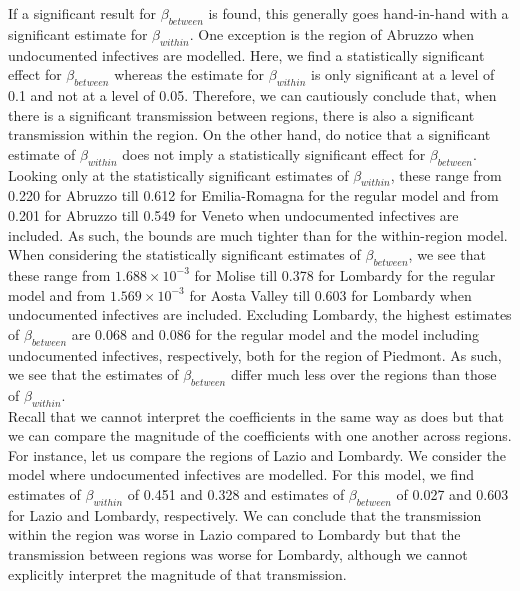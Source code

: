 \documentclass[12pt]{article}
\begin{document}
	If a significant result for $\beta_{between}$ is found, this generally goes hand-in-hand with a significant estimate for $\beta_{within}$. One exception is the region of Abruzzo when undocumented infectives are modelled. Here, we find a statistically significant effect for $\beta_{between}$ whereas the estimate for $\beta_{within}$ is only significant at a level of 0.1 and not at a level of 0.05. Therefore, we can cautiously conclude that, when there is a significant transmission between regions, there is also a significant transmission within the region. On the other hand, do notice that a significant estimate of $\beta_{within}$ does not imply a statistically significant effect for $\beta_{between}$. \\
	
	Looking only at the statistically significant estimates of $\beta_{within}$, these range from 0.220 for Abruzzo till 0.612 for Emilia-Romagna for the regular model and from 0.201 for Abruzzo till 0.549 for Veneto when undocumented infectives are included. As such, the bounds are much tighter than for the within-region model. When considering the statistically significant estimates of $\beta_{between}$, we see that these range from $1.688 \times 10^{-3}$ for Molise till 0.378 for Lombardy for the regular model and from $1.569 \times 10^{-3}$ for Aosta Valley till 0.603 for Lombardy when undocumented infectives are included. Excluding Lombardy, the highest estimates of $\beta_{between}$ are 0.068 and 0.086 for the regular model and the model including undocumented infectives, respectively, both for the region of Piedmont. As such, we see that the estimates of $\beta_{between}$ differ much less over the regions than those of $\beta_{within}$. \\
	
	Recall that we cannot interpret the coefficients in the same way as \textcite{adda2016economic} does but that we can compare the magnitude of the coefficients with one another across regions. For instance, let us compare the regions of Lazio and Lombardy. We consider the model where undocumented infectives are modelled. For this model, we find estimates of $\beta_{within}$ of 0.451 and 0.328 and estimates of $\beta_{between}$ of 0.027 and 0.603 for Lazio and Lombardy, respectively. We can conclude that the transmission within the region was worse in Lazio compared to Lombardy but that the transmission between regions was worse for Lombardy, although we cannot explicitly interpret the magnitude of that transmission. \\
	
\end{document}
